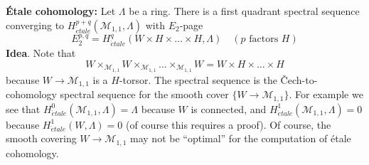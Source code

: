 \medskip\noindent
{\bf \'Etale cohomology:} Let $\Lambda$ be a ring.
There is a first quadrant spectral sequence
converging to $H^{p + q}_{\acute{e}tale}(\mathcal{M}_{1, 1}, \Lambda)$
with $E_2$-page
$$
E_2^{p, q} = H_{\acute{e}tale}^q(W \times H \times \ldots \times H, \Lambda)
\quad(p\text{ factors }H)
$$
\noindent
{\bf Idea}. Note that
$$
W \times_{\mathcal{M}_{1, 1}} W \times_{\mathcal{M}_{1, 1}}
\ldots \times_{\mathcal{M}_{1, 1}} W
= W \times H \times \ldots \times H
$$
because $W \to \mathcal{M}_{1, 1}$ is a $H$-torsor. The spectral
sequence is the {\v C}ech-to-cohomology spectral sequence for
the smooth cover $\{W \to \mathcal{M}_{1, 1}\}$. For example we see that
$H^0_{\acute{e}tale}(\mathcal{M}_{1, 1}, \Lambda) = \Lambda$ because
$W$ is connected, and $H^1_{\acute{e}tale}(\mathcal{M}_{1, 1}, \Lambda) = 0$
because $H^1_{\acute{e}tale}(W, \Lambda) = 0$ (of course this requires
a proof). Of course, the smooth covering $W \to \mathcal{M}_{1, 1}$ may
not be ``optimal'' for the computation of \'etale cohomology.




















